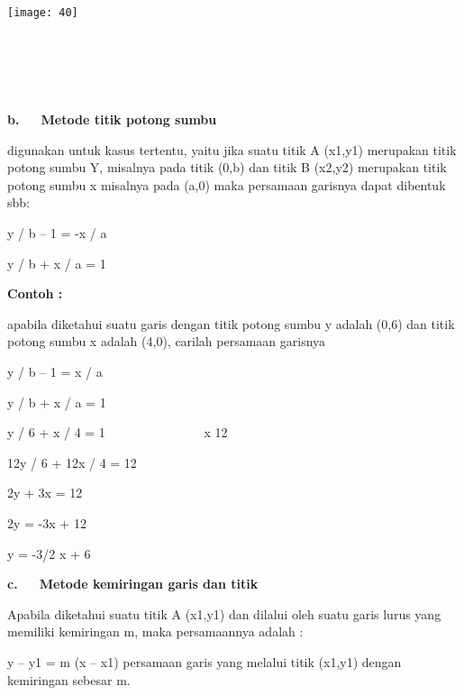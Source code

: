 \documentclass[11pt,fleqn]{book} %
\begin{document}
\noindent ~

\begin{center}
\noindent \texttt{[image: 40]}
\end{center}

\noindent 

\noindent ~ ~ ~ ~ ~ ~ ~ ~ ~ ~ ~ ~ ~ ~ ~ ~ ~ ~ ~ ~ ~ ~ ~ ~ ~ ~ ~ ~ ~ ~ ~ ~ ~ ~ ~ ~ ~ ~ ~ ~ ~ ~ ~ ~ ~ ~ ~ ~~

\noindent ~~~~~~~~~~~~~~~~~~~~~~~~~~~~~~~~~~~~

\noindent \textbf{b.~~~Metode titik potong sumbu}

\noindent \textbf{}

\noindent digunakan untuk kasus tertentu, yaitu jika suatu titik A (x1,y1) merupakan titik potong sumbu Y, misalnya pada titik (0,b) dan titik B (x2,y2) merupakan titik potong sumbu x misalnya pada (a,0) maka persamaan garisnya dapat dibentuk sbb:

\noindent 

\noindent y / b -- 1 = -x / a~~

\noindent y / b + x / a = 1

\noindent 

\noindent \textbf{Contoh :}

\noindent \textbf{}

\noindent apabila diketahui suatu garis dengan titik potong sumbu y adalah (0,6) dan titik potong sumbu x adalah (4,0), carilah persamaan garisnya

\noindent 

\noindent y / b -- 1 = x / a

\noindent y / b + x / a = 1

\noindent y / 6 + x / 4 = 1~~~~~~~~~~~~~~~ x 12

\noindent 12y / 6 + 12x / 4 = 12

\noindent 2y + 3x = 12

\noindent 2y = -3x + 12

\noindent y = -3/2 x + 6

\noindent 

\noindent 

\noindent \textbf{c.~~~Metode kemiringan garis dan titik}

\noindent Apabila diketahui suatu titik A (x1,y1) dan dilalui oleh suatu garis lurus yang memiliki kemiringan m, maka persamaannya adalah :

\noindent 

\noindent y -- y1 = m (x -- x1) persamaan garis yang melalui titik (x1,y1) dengan kemiringan sebesar m. 
\end{document}
